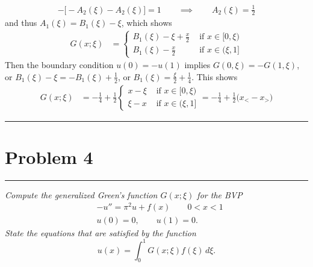 \documentclass{article} %
\theoremstyle{plain}
\newcommand{\problem}[1]{
\vspace{.375cm}
\begin{minipage}{\textwidth}
    \begin{center}
        \noindent\rule{5cm}{1pt}
    \end{center}
    \section{\bf #1}
    \begin{center}
        \noindent\rule{5cm}{1pt}
    \end{center}
    \vspace{0.25cm}
\end{minipage}
}
\begin{document}
\begin{align*}
    -\Big[-A_2(\xi) - A_2(\xi)\Big] = 1 \qquad \implies \qquad A_2(\xi) = \frac{1}{2}
\end{align*}
and thus $A_1(\xi) = B_1(\xi) - \xi$, which shows
\begin{align*}
    G(x;\xi) &= \begin{cases}
        B_1(\xi) - \xi + \frac{x}{2} & \text{ if } x \in [0, \xi) \\
        B_1(\xi) - \frac{x}{2} & \text{ if } x \in (\xi, 1]
    \end{cases}
\end{align*}
Then the boundary condition $u(0) = -u(1)$ implies $G(0, \xi) = -G(1, \xi)$, or $B_1(\xi) - \xi = -B_1(\xi) + \frac{1}{2}$, or $B_1(\xi) = \frac{\xi}{2} + \frac{1}{4}$.  This shows
\begin{align*}
    G(x;\xi) &= -\frac{1}{4} + \frac{1}{2}\begin{cases}
        x - \xi & \text{ if } x \in [0, \xi) \\
        \xi - x & \text{ if } x \in (\xi, 1]
    \end{cases} = -\frac{1}{4} + \frac{1}{2}\big(x_< - x_>\big)
\end{align*}





\problem{Problem 4}
\emph{Compute the generalized Green's function $G(x;\xi)$ for the BVP
\begin{align*}
&-u'' = \pi^2 u + f(x)\qquad 0<x<1
\\
&u(0) = 0,\qquad u(1)=0.
\end{align*}
State the equations that are satisfied by the function
\[
u(x) = \int_0^1 G(x;\xi) f(\xi)\, d\xi.
\]}
\end{document}
